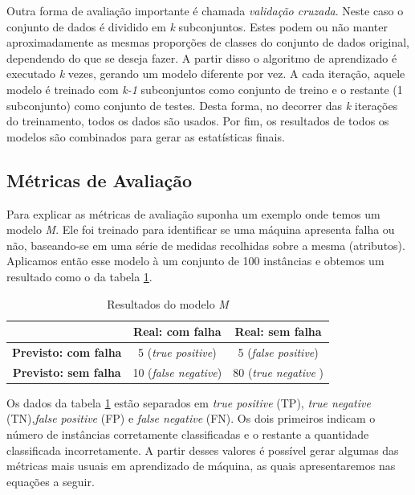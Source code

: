 Outra forma de avaliação importante é chamada \textit{validação cruzada}.
Neste caso o conjunto de dados é dividido em \textit{k} subconjuntos.
Estes podem ou não manter aproximadamente as mesmas proporções de classes do conjunto de dados original, dependendo do que se deseja fazer.
A partir disso o algoritmo de aprendizado é executado \textit{k} vezes, gerando um modelo diferente por vez.
A cada iteração, aquele modelo é treinado com \textit{k-1} subconjuntos como conjunto de treino e o restante (1 subconjunto) como conjunto de testes.
Desta forma, no decorrer das \textit{k} iterações do treinamento, todos os dados são usados.
Por fim, os resultados de todos os modelos são combinados para gerar as estatísticas finais.

\subsection{Métricas de Avaliação}

Para explicar as métricas de avaliação suponha um exemplo onde temos um modelo \textit{M}.
Ele foi treinado para identificar se uma máquina apresenta falha ou não, baseando-se em uma série de medidas recolhidas sobre a mesma (atributos).
Aplicamos então esse modelo à um conjunto de 100 instâncias e obtemos um resultado como o da tabela \ref{tab:positivosenegativos}.

\begin{table}[h!]
  \begin{center}
    \begin{tabular}{ccc}
      \hline
        & \textbf{Real: com falha} & \textbf{Real: sem falha} \\
      \hline

      \textbf{Previsto: com falha} & 5 (\textit{true positive}) & 5 (\textit{false positive}) \\
      \textbf{Previsto: sem falha} & 10 (\textit{false negative}) & 80 (\textit{true negative} )\\

      \hline
    \end{tabular}
    \caption{Resultados do modelo \textit{M}}
    \label{tab:positivosenegativos}
  \end{center}
\end{table}

Os dados da tabela \ref{tab:positivosenegativos} estão separados em \textit{true positive} (TP), \textit{true negative} (TN),\textit{false positive} (FP) e \textit{false negative} (FN).
Os dois primeiros indicam o número de instâncias corretamente classificadas e o restante a quantidade classificada incorretamente.
A partir desses valores é possível gerar algumas das métricas mais usuais em aprendizado de máquina, as quais apresentaremos nas equações a seguir.

